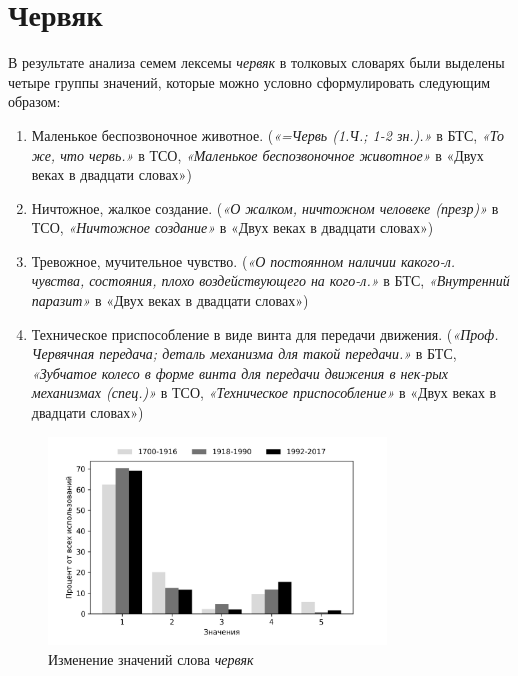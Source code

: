 \section*{Червяк}

В результате анализа семем лексемы \textit{червяк} в толковых словарях были выделены четыре группы значений,
которые можно условно сформулировать следующим образом:

\begin{enumerate}
    \item Маленькое беспозвоночное животное.
    (\textit{«=Червь (1.Ч.; 1-2 зн.).»} в БТС,
    \textit{«То же, что червь.»} в ТСО,
    \textit{«Маленькое беспозвоночное животное»} в «Двух веках в двадцати словах»)

    \item Ничтожное, жалкое создание.
    (\textit{«О жалком, ничтожном человеке (презр)»} в ТСО,
    \textit{«Ничтожное создание»} в «Двух веках в двадцати словах»)

    \item Тревожное, мучительное чувство.
    (\textit{«О постоянном наличии какого-л. чувства, состояния, плохо воздействующего на кого-л.»} в БТС,
\textit{«Внутренний паразит»} в «Двух веках в двадцати словах»)

    \item Техническое приспособление в виде винта для передачи движения.
    (\textit{«Проф. Червячная передача; деталь механизма для такой передачи.»} в БТС,
    \textit{«Зубчатое колесо в форме винта для передачи движения в нек-рых механизмах (спец.)»} в ТСО,
    \textit{«Техническое приспособление»} в «Двух веках в двадцати словах»)
\end{enumerate}

\begin{figure}[H]
	\centering
	\includegraphics[width=0.8\textwidth]{img/visualizations/chervjak_minimal}
	\caption{Изменение значений слова \textit{червяк}}
	\label{fig:Червяк}
\end{figure}

